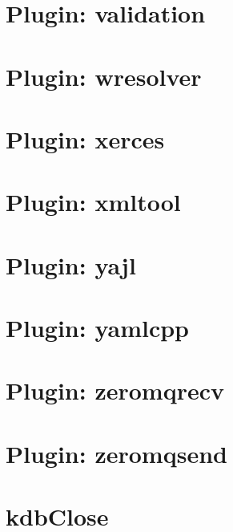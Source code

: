 \let\mypdfximage\pdfximage\def\pdfximage{\immediate\mypdfximage}\documentclass[twoside]{book}
\newcommand{\+}{\discretionary{\mbox{\scriptsize$\hookleftarrow$}}{}{}}
\begin{document}
\chapter{Plugin\+: validation}
\label{md_src_plugins_validation_README}

\chapter{Plugin\+: wresolver}
\label{md_src_plugins_wresolver_README}

\chapter{Plugin\+: xerces}
\label{md_src_plugins_xerces_README}

\chapter{Plugin\+: xmltool}
\label{md_src_plugins_xmltool_README}

\chapter{Plugin\+: yajl}
\label{md_src_plugins_yajl_README}

\chapter{Plugin\+: yamlcpp}
\label{md_src_plugins_yamlcpp_README}

\chapter{Plugin\+: zeromqrecv}
\label{md_src_plugins_zeromqrecv_README}

\chapter{Plugin\+: zeromqsend}
\label{md_src_plugins_zeromqsend_README}

\chapter{kdb\+Close}
\label{doc_api_review_core_kdbClose_md}

\end{document}
